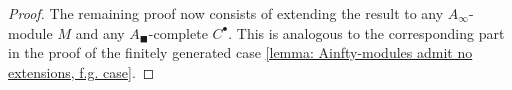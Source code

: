 \begin{proof}
	The remaining proof now consists of extending the result to any $A_\infty$-module $M$ and any $A_\blacksquare$-complete $C^\bullet$. This is analogous to the corresponding part in the proof of the finitely generated case \ref{lemma: Ainfty-modules admit no extensions, f.g. case}.
	
%	
%		
%	
%	
	

\end{proof}
